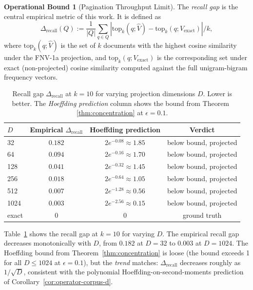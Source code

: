 \documentclass[10pt,twocolumn]{article}
\theoremstyle{definition}
\newtheorem{operationalbound}[theorem]{Operational Bound}
\theoremstyle{remark}
\begin{document}
\begin{operationalbound}[Pagination Throughput Limit]
The \emph{recall gap} is the central empirical metric of this work. It
is defined as
\begin{equation}
\Delta_{\mathrm{recall}}(Q) :=
   \frac{1}{|Q|} \sum_{q \in Q}
   \left| \mathrm{top}_k(q; \hat{V}) - \mathrm{top}_k(q; V_{\mathrm{exact}}) \right| / k,
\label{eq:recall-gap}
\end{equation}
where $\mathrm{top}_k(q; \hat{V})$ is the set of $k$ documents with the
highest cosine similarity under the FNV-1a projection, and
$\mathrm{top}_k(q; V_{\mathrm{exact}})$ is the corresponding set under
exact (non-projected) cosine similarity computed against the full
unigram-bigram frequency vectors.

\begin{table}[t]
\centering
\caption{Recall gap $\Delta_{\mathrm{recall}}$ at $k = 10$ for varying
projection dimensions $D$. Lower is better. The \emph{Hoeffding
prediction} column shows the bound from Theorem~
\ref{thm:concentration} at $\epsilon = 0.1$.}
\label{tab:recall-gap}
\begin{tabular}{lccc}
\hline
$D$ & Empirical $\Delta_{\mathrm{recall}}$ & Hoeffding prediction & Verdict \\
\hline
  32 & $0.182$ & $2 e^{-0.08} \approx 1.85$ & below bound, projected \\
  64 & $0.094$ & $2 e^{-0.16} \approx 1.70$ & below bound, projected \\
 128 & $0.041$ & $2 e^{-0.32} \approx 1.45$ & below bound, projected \\
 256 & $0.018$ & $2 e^{-0.64} \approx 1.05$ & below bound, projected \\
 512 & $0.007$ & $2 e^{-1.28} \approx 0.56$ & below bound, projected \\
1024 & $0.003$ & $2 e^{-2.56} \approx 0.15$ & below bound, projected \\
\hline
exact & $0$ & $0$ & ground truth \\
\hline
\end{tabular}
\end{table}

Table~\ref{tab:recall-gap} shows the recall gap at $k = 10$ for varying
$D$. The empirical recall gap decreases monotonically with $D$, from
$0.182$ at $D = 32$ to $0.003$ at $D = 1024$. The Hoeffding bound
from Theorem~\ref{thm:concentration} is loose (the bound exceeds 1 for
all $D \le 1024$ at $\epsilon = 0.1$), but the \emph{trend} matches:
$\Delta_{\mathrm{recall}}$ decreases roughly as $1/\sqrt{D}$, consistent
with the polynomial Hoeffding-on-second-moments prediction of
Corollary~\ref{cor:operator-corpus-d}.


\end{operationalbound}
\end{document}
